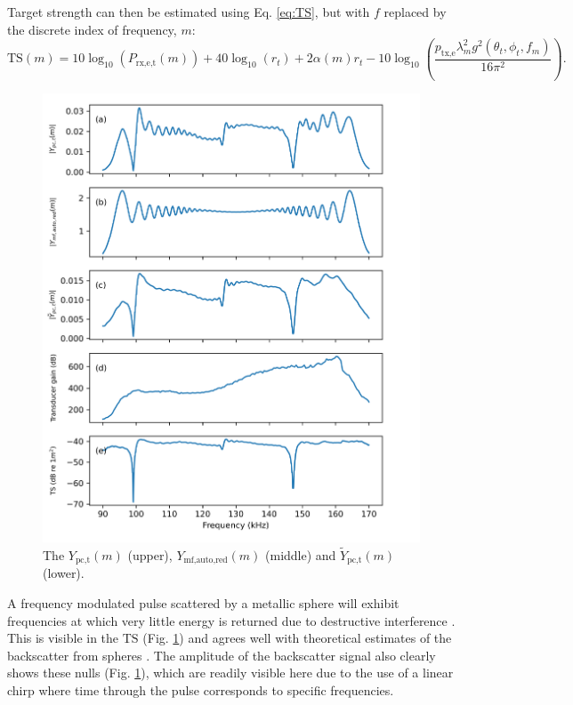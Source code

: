 \documentclass[preprint,12pt,TurnOnLineNumbers]{JASAnew}
\newcommand{\freqsym}{f}
\newcommand{\samplesymf}{m}
\newcommand{\ptxe}{p_{\textrm{tx,e}}}
\newcommand{\ypctargetf}{Y_{\textrm{pc,t}}}
\newcommand{\ypctargetnormf}{\tilde{Y}_{\textrm{pc,t}}}
\newcommand{\ymfautoredf}{Y_{\textrm{mf,auto,red}}}
\newcommand{\prxetf}{P_{\textrm{rx,e,t}}}
\newcommand{\ts}{\textrm{TS}}
\newcommand{\range}{r}
\newcommand{\athw}{\phi}
\newcommand{\along}{\theta}
\newcommand{\gain}{g}
\newcommand{\wlen}{\lambda}
\newcommand{\absorp}{\alpha}
\begin{document}
Target strength can then be estimated using Eq. \ref{eq:TS}, but with $\freqsym$ replaced by the discrete index of frequency, $\samplesymf$:
\begin{equation}
\label{eq:TS_f}
\ts(\samplesymf) = 10\log_{10}(\prxetf(\samplesymf)) + 40\log_{10}(\range_t) + 2\absorp(\samplesymf)\range_t 
- 10\log_{10}\left( \frac{\ptxe \wlen_\samplesymf^2 \gain^2(\along_t,\athw_t,f_\samplesymf)}{16\pi^2} \right).
\end{equation}
%
\begin{figure}
\includegraphics[width=16cm]{Fig_TS}
\caption{\label{fi:TS}The $\ypctargetf(\samplesymf)$ (upper), $\ymfautoredf(\samplesymf)$ (middle) and $\ypctargetnormf(\samplesymf)$ (lower).}
\end{figure}

A frequency modulated pulse scattered by a metallic sphere will exhibit frequencies at which very little energy is returned due to destructive interference \citep{stanton2008}. This is visible in the $\ts$ (Fig. \ref{fi:TS}) and agrees well with theoretical estimates of the backscatter from spheres \citep{maclennan1981}. The amplitude of the backscatter signal also clearly shows these nulls (Fig. \ref{fi:TS}), which are readily visible here due to the use of a linear chirp where time through the pulse corresponds to specific frequencies. 
\end{document}
